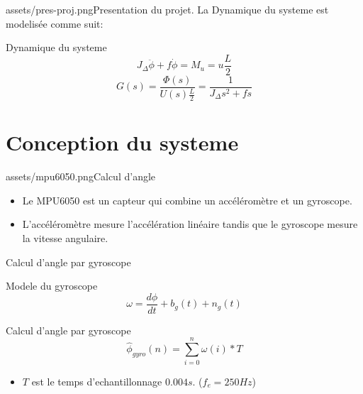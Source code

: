 \documentclass{beamer}
\begin{document}
\begin{sidepic}{assets/pres-proj.png}{Presentation du projet.}
	La Dynamique du systeme est modelisée comme suit:
	\begin{block}{Dynamique du systeme}
		\begin{equation*}
			J_\Delta \ddot{\phi} + f \dot{\phi} = M_u = u \frac{L}{2}
		\end{equation*}
		\begin{equation*}
			G(s) = \frac{\Phi(s)}{U(s) \frac{L}{2}} = \frac{1}{J_\Delta s^2 + f s}
		\end{equation*}
	\end{block}
\end{sidepic}



\section{Conception du systeme}




\begin{sidepic}{assets/mpu6050.png}{Calcul d'angle}
	\begin{itemize}
		\item Le MPU6050 est un capteur qui combine un accéléromètre et un gyroscope.
		\item L'accéléromètre mesure l'accélération linéaire tandis que le gyroscope mesure la vitesse angulaire.
	\end{itemize}
\end{sidepic}


\begin{frame}[fragile]{Calcul d'angle par gyroscope}
	\begin{block}{Modele du gyroscope}
		\begin{equation*}
			\omega = \frac{d\phi}{dt} + b_g(t) + n_g(t)
		\end{equation*}
	\end{block}
	\begin{block}{Calcul d'angle par gyroscope}
		\begin{equation*}
			\hat{\phi}_{gyro}(n) =  \sum_{i=0}^{n} \omega(i) * T
		\end{equation*}
	\end{block}
	\begin{itemize}
		\item $T$ est le temps d'echantillonnage $0.004s$.  ($f_e = 250Hz$)
	\end{itemize}
\end{frame}
\end{document}
